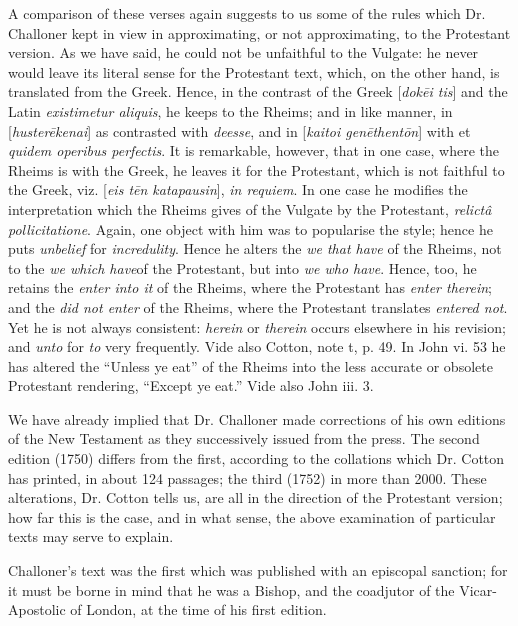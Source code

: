 A comparison of these verses again suggests to us some of the rules
which Dr. Challoner kept in view in approximating, or not
approximating, to the Protestant version. As we have said, he
could not be unfaithful to the Vulgate: he never would leave its
literal sense for the Protestant text, which, on the other hand, is
translated from the Greek. Hence, in the contrast of the Greek [\emph{dok\={e}i
tis}] and the Latin \emph{existimetur aliquis}, he keeps to the
Rheims; and in like manner, in [\emph{huster\={e}kenai}] as
contrasted with \emph{deesse}, and in [\emph{kaitoi gen\={e}thent\={o}n}]
with et \emph{quidem operibus perfectis}. It is remarkable, however,
that in one case, where the Rheims is with the Greek, he leaves it for
the Protestant, which is not faithful to the Greek, viz. [\emph{eis t\={e}n
katapausin}], \emph{in requiem}. In one case he modifies the
interpretation which the Rheims gives of the Vulgate by the
Protestant, \emph{relictâ pollicitatione}. Again, one object with him
was to popularise the style; hence he puts \emph{unbelief} for \emph{incredulity}.
Hence he alters the \emph{we that have} of the Rheims, not to the \emph{we
which have}of the Protestant, but into \emph{we who have}. Hence,
too, he retains the \emph{enter into it} of the Rheims, where the
Protestant has \emph{enter therein}; and the \emph{did not enter} of
the Rheims, where the Protestant translates \emph{entered not}. Yet he
is not always consistent: \emph{herein} or \emph{therein} occurs
elsewhere in his revision; and \emph{unto} for \emph{to} very
frequently. Vide also Cotton, note t, p. 49. In John vi. 53 he has
altered the ``Unless ye eat'' of the Rheims into the less
accurate or obsolete Protestant rendering, ``Except ye eat.''
Vide also John iii. 3.

We have already implied that Dr. Challoner made corrections of his
own editions of the New Testament as they successively issued from the
press. The second edition (1750) differs from the first, according to
the collations which Dr. Cotton has printed, in about 124
passages; the third (1752) in more than 2000. These alterations, Dr.
Cotton tells us, are all in the direction of the Protestant version;
how far this is the case, and in what sense, the above examination of
particular texts may serve to explain.

Challoner's text was the first which was published with an
episcopal sanction; for it must be borne in mind that he was a Bishop,
and the coadjutor of the Vicar-Apostolic of London, at the time of his
first edition.

